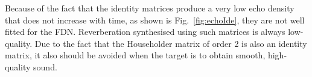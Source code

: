 \documentclass[twoside,a4paper]{article}
\begin{document}
Because of the fact that the identity matrices produce a very low echo density that does not increase with time, as shown is Fig.~\ref{fig:echoIde}, they are not well fitted for the FDN. Reverberation synthesised using such matrices is always low-quality.  Due to the fact that the Householder matrix of order 2 is also an identity matrix, it also should be avoided when the target is to obtain smooth, high-quality sound. 
\begin{figure}[ht!]
    \centering
    \hfill
     \hfill
     \hfill

\end{figure}
\end{document}
